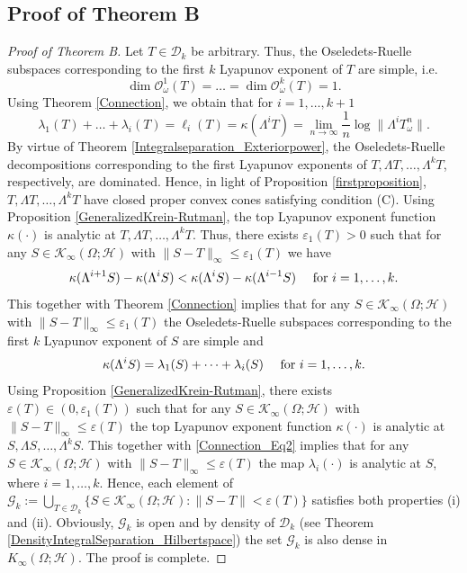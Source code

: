 \documentclass[pdflatex,sn-mathphys-num]{sn-jnl}%
\theoremstyle{thmstyleone}%
\theoremstyle{thmstyletwo}%
\theoremstyle{thmstylethree}%
\newcommand{\eps}{\varepsilon}
\numberwithin{equation}{section}
\begin{document}
\subsection{Proof of Theorem B}
%
\begin{proof}[Proof of Theorem B] Let $T\in \mathcal D_k$ be arbitrary. Thus, the Oseledets-Ruelle subspaces corresponding to the first $k$ Lyapunov exponent of $T$ are simple, i.e.
\[
\dim \mathcal O^1_{\omega}(T)=\dots=\dim \mathcal O^k_{\omega}(T)=1.
\]
Using Theorem \ref{Connection}, we obtain that for $i=1,\dots,k+1$
\begin{equation}\label{Connection_Eq1}
\lambda_1(T)+\dots+\lambda_i(T)=\ell_i(T)=\kappa(\Lambda^iT)=\lim_{n\to\infty}\frac{1}{n}\log\|\Lambda^iT^n_{\omega}\|.
\end{equation}
By virtue of Theorem \ref{Integralseparation_Exteriorpower}, the Oseledets-Ruelle decompositions corresponding to the first Lyapunov exponents of $T,\Lambda T,\dots,\Lambda^k T$, respectively, are dominated. Hence, in light of Proposition \ref{firstproposition}, $T,\Lambda T,\dots,\Lambda^k T$ have closed proper convex cones satisfying condition (C). Using  Proposition \ref{GeneralizedKrein-Rutman}, the top Lyapunov exponent function $\kappa(\cdot)$ is analytic at $T, \Lambda T,\dots,\Lambda^k T$. Thus, there exists $\eps_1(T)>0$ such that for any  $S\in \mathcal K_{\infty}(\Omega;\mathcal H)$ with $\|S-T\|_{\infty}\leq \eps_1(T)$ we have 
\[
\kappa(\Lambda^{i+1}S)-\kappa(\Lambda^{i}S)<\kappa(\Lambda^{i}S)-\kappa(\Lambda^{i-1}S)\quad \hbox{ for } i=1,\dots,k.
\]
This together with Theorem \ref{Connection} implies that for any  $S\in \mathcal K_{\infty}(\Omega;\mathcal H)$ with $\|S-T\|_{\infty}\leq \eps_1(T)$ 
the Oseledets-Ruelle subspaces corresponding to the first $k$ Lyapunov exponent of $S$ are simple and 
\begin{equation}\label{Connection_Eq2}
\kappa(\Lambda^i S)=\lambda_1(S)+\dots+\lambda_i(S)\quad \hbox{ for } i=1,\dots,k.    
\end{equation}
%
%
Using  Proposition \ref{GeneralizedKrein-Rutman}, there exists $\eps(T)\in (0,\eps_1(T))$ such that for any  $S\in \mathcal K_{\infty}(\Omega;\mathcal H)$ with $\|S-T\|_{\infty}\leq \eps(T)$ the top Lyapunov exponent function $\kappa(\cdot)$ is analytic at $S, \Lambda S,\dots,\Lambda^k S$. This together with \eqref{Connection_Eq2} implies that for any  $S\in \mathcal K_{\infty}(\Omega;\mathcal H)$ with $\|S-T\|_{\infty}\leq \eps(T)$  the map $\lambda_i(\cdot)$ is analytic at $S$, where $i=1,\dots,k$. Hence, each element of  $\mathcal G_k:=\bigcup_{T\in\mathcal D_k} \{S\in \mathcal K_{\infty}(\Omega;\mathcal H): \|S-T\|<\eps(T)\}$ satisfies both properties (i) and (ii). Obviously, $\mathcal G_k$ is open and by density of $\mathcal D_k$ (see Theorem \ref{DensityIntegralSeparation_Hilbertspace}) the set $\mathcal G_k$ is also dense in $K_{\infty}(\Omega;\mathcal H)$. The proof is complete.
\end{proof}
\end{document}

